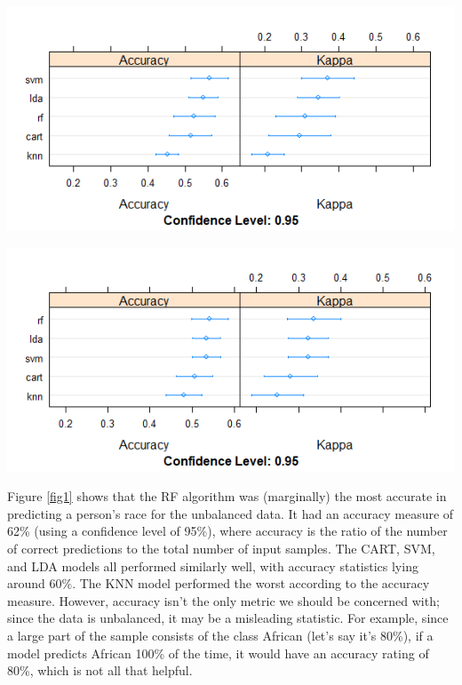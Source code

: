 \documentclass[11pt,preprint, authoryear]{elsarticle}
\let\origfigure\figure
\let\endorigfigure\endfigure
\renewenvironment{figure}[1][2] {
    \expandafter\origfigure\expandafter[H]
} {
    \endorigfigure
}
\numberwithin{equation}{section}
\numberwithin{figure}{section}
\numberwithin{table}{section}
\begin{document}
\begin{figure}[htbp]
\centering
\includegraphics{images/bal1.png}
\caption{Machine Learning applied to balanced (undersampled) data \label{fig2}}
\end{figure}

\begin{figure}[htbp]
\centering
\includegraphics{images/bal2.png}
\caption{Machine Learning applied to balanced data \label{fig3}}
\end{figure}

Figure \ref{fig1} shows that the RF algorithm was (marginally) the most
accurate in predicting a person's race for the unbalanced data. It had
an accuracy measure of 62\% (using a confidence level of 95\%), where
accuracy is the ratio of the number of correct predictions to the total
number of input samples. The CART, SVM, and LDA models all performed
similarly well, with accuracy statistics lying around 60\%. The KNN
model performed the worst according to the accuracy measure. However,
accuracy isn't the only metric we should be concerned with; since the
data is unbalanced, it may be a misleading statistic. For example, since
a large part of the sample consists of the class African (let's say it's
80\%), if a model predicts African 100\% of the time, it would have an
accuracy rating of 80\%, which is not all that helpful.
\end{document}
